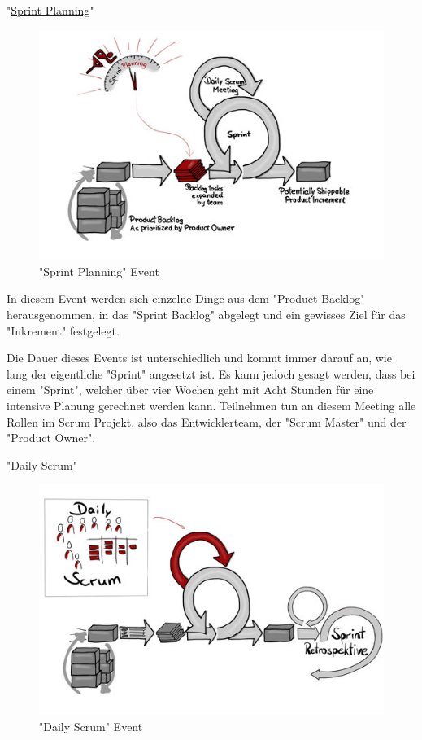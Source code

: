 \cite{Scrum}

"\underline{Sprint Planning}"

\begin{figure}[H]
    \centering
    \includegraphics[width=\textwidth]{media/ProjectManagement/SprintPlanning.jpg}
    \caption{"Sprint Planning" Event \cite{PlanningBild}}
\end{figure}

In diesem Event werden sich einzelne Dinge aus dem "Product Backlog" herausgenommen, in das "Sprint Backlog" abgelegt und ein gewisses Ziel für das "Inkrement" festgelegt. \cite{Planning}

Die Dauer dieses Events ist unterschiedlich und kommt immer darauf an, wie lang der eigentliche "Sprint" angesetzt ist. Es kann jedoch gesagt werden, dass bei einem "Sprint", welcher über vier Wochen geht mit Acht Stunden für eine intensive Planung gerechnet werden kann. Teilnehmen tun an diesem Meeting alle Rollen im Scrum Projekt, also das Entwicklerteam, der "Scrum Master" und der "Product Owner". \cite{Planning}

"\underline{Daily Scrum}"

\begin{figure}[H]
    \centering
    \includegraphics[width=\textwidth]{media/ProjectManagement/DailyScrum.jpg}
    \caption{"Daily Scrum" Event \cite{DailyScrumBild}}
\end{figure}

